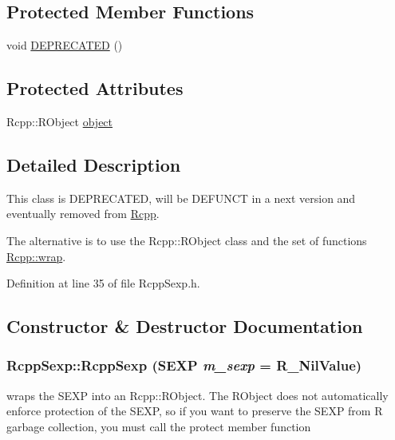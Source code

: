 \subsection*{Protected Member Functions}
\begin{DoxyCompactItemize}
\item 
void \hyperlink{classRcppSexp_acb702de59d20b6d4f5a0ca8a8052f1b9}{DEPRECATED} ()
\end{DoxyCompactItemize}
\subsection*{Protected Attributes}
\begin{DoxyCompactItemize}
\item 
Rcpp::RObject \hyperlink{classRcppSexp_a9f77d55d1399aa8b7526357bc31204de}{object}
\end{DoxyCompactItemize}


\subsection{Detailed Description}
This class is DEPRECATED, will be DEFUNCT in a next version and eventually removed from \hyperlink{namespaceRcpp}{Rcpp}.

The alternative is to use the Rcpp::RObject class and the set of functions \hyperlink{namespaceRcpp_aa47be58d105b733ced235de53b5691af}{Rcpp::wrap}. 

Definition at line 35 of file RcppSexp.h.

\subsection{Constructor \& Destructor Documentation}
\hypertarget{classRcppSexp_a37253a883401c9714dbd3ec50e0f78a1}{
\subsubsection[{RcppSexp}]{\setlength{\rightskip}{0pt plus 5cm}RcppSexp::RcppSexp (SEXP {\em m\_\-sexp} = {\ttfamily R\_\-NilValue})}}
\label{classRcppSexp_a37253a883401c9714dbd3ec50e0f78a1}
wraps the SEXP into an Rcpp::RObject. The RObject does not automatically enforce protection of the SEXP, so if you want to preserve the SEXP from R garbage collection, you must call the protect member function 

